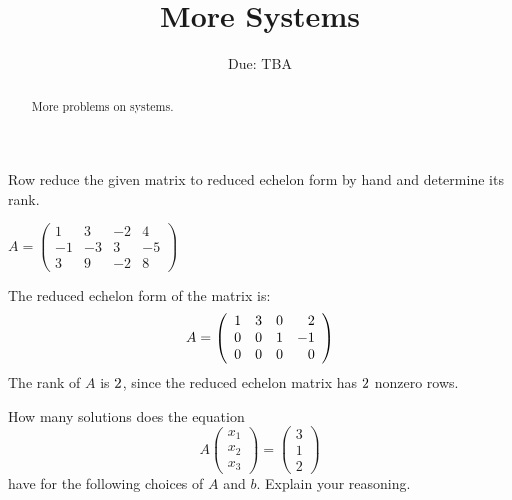 \documentclass{ximera}
\title{More Systems}
\author{\phantom{Dr. Golubitsky}}
\date{Due: TBA}
\begin{document}
\begin{abstract}
More problems on systems. 
\end{abstract}
\maketitle


\problemlabel

\noindent Row reduce the given  matrix to reduced echelon form by hand and determine its rank.

\begin{exercise} %
$A=\left(\begin{array}{rrrr}
1 &  3 & -2 & 4\\
-1 &  -3 & 3 & -5\\
3 &  9 & -2 & 8
         \end{array}\right)$
       \begin{prompt}
       The reduced echelon form of the matrix is:
\[
A = \left(\begin{array}{rrrr} 1 & {3} & {0} & {2} \\ 
         0 & {0} & {1} & {-1} \\ 
         0 & 0 & {0} & 0\end{array}\right)
\]
The rank of $A$ is ${2}$, since the reduced echelon matrix has ${2}$ nonzero
rows.         
       \end{prompt}

\end{exercise}

\problemlabel




How many solutions does the equation
\[
A \begin{pmatrix}x_1 \\ x_2 \\ x_3\end{pmatrix} = 
 \begin{pmatrix}3 \\ 1 \\ 2\end{pmatrix}
\]
have for the following choices of $A$ and $b$.  Explain your reasoning.
\end{document}
